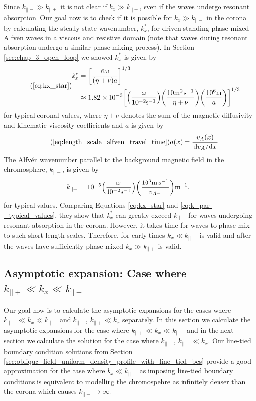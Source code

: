 Since $k_{||-}\gg k_{||+}$ it is not clear if $k_x \gg k_{||-}$, even if the waves undergo resonant absorption. Our goal now is to check if it is possible for $k_x\gg k_{||-}$ in the corona by calculating the steady-state wavenumber, $k_x^*$, for driven standing phase-mixed Alfv\'en waves in a viscous and resistive domain (note that waves during resonant absorption undergo a similar phase-mixing process). In Section \ref{sec:chap_3_open_loop} we showed $k_x^*$ is given by
\begin{equation}
    \tag{\ref{eq:kx_star}}
\begin{aligned}
    k_x^* &= \qty[\frac{6\omega}{(\eta+\nu)a}]^{1/3} \\
    &\approx 1.82 \times10^{-3} \qty[\qty(\frac{\omega}{10^{-2}\si{.s^{-1}}})\qty(\frac{10\si{.m^2.s^{-1}}}{\eta+\nu})\qty(\frac{10^6\si{.m}}{a})]^{1/3}
\end{aligned}
\end{equation}
for typical coronal values, where $\eta+\nu$ denotes the sum of the magnetic diffusivity and kinematic viscosity coefficients and $a$ is given by
\begin{equation}
    \tag{\ref{eq:length_scale_alfven_travel_time}}
    a(x) = \frac{v_A(x)}{\dv*{v_A}{x}},
\end{equation}
The Alfv\'en wavenumber parallel to the background magnetic field in the chromosphere, $k_{||-}$, is given by
\small
\begin{equation}
    \label{eq:k_par-_typical_values}
    k_{||-} = 10^{-5}\qty(\frac{\omega}{10^{-2}\si{.s^{-1}}})\qty(\frac{10^3\si{.m.s^{-1}}}{v_{A-}})\si{.m^{-1}}.
\end{equation}
\normalsize
for typical values. Comparing Equations \eqref{eq:kx_star} and \eqref{eq:k_par-_typical_values}, they show that $k_x^*$ can greatly exceed $k_{||-}$ for waves undergoing resonant absorption in the corona. However, it takes time for waves to phase-mix to such short length scales. Therefore, for early times $k_x\ll k_{||-}$ is valid and after the waves have sufficiently phase-mixed $k_x \gg k_{||+}$ is valid. 

\subsection{Asymptotic expansion: Case where \texorpdfstring{$k_{||+} \ll k_x\ll k_{||-}$}{kx||+ << kx << k||-}}

Our goal now is to calculate the asymptotic expansions for the cases where $k_{||+} \ll k_x\ll k_{||-}$ and $k_{||-}$, $k_{||+} \ll k_x$ separately. In this section we calculate the asymptotic expansions for the case where $k_{||+} \ll k_x\ll k_{||-}$ and in the next section we calculate the solution for the case where $k_{||-}$, $k_{||+} \ll k_x$. Our line-tied boundary condition solutions from Section \ref{sec:oblique_field_uniform_density_profile_with_line_tied_bcs} provide a good approximation for the case where $k_x \ll k_{||-}$ as imposing line-tied boundary conditions is equivalent to modelling the chromospehre as infinitely denser than the corona which causes $k_{||-}\rightarrow \infty$.

